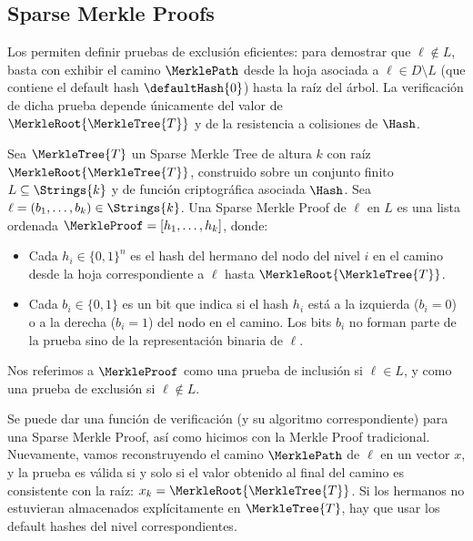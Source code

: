 \subsection{Sparse Merkle Proofs}

Los \SMT permiten definir pruebas de exclusión eficientes: para demostrar que $\ell \not\in L$, basta con exhibir el camino $\MerklePath$ desde la hoja asociada a $\ell \in D \setminus {L}$ (que contiene el default hash $\defaultHash{0}$) hasta la raíz del árbol. La verificación de dicha prueba depende únicamente del valor de $\MerkleRoot{\MerkleTree{T}}$ y de la resistencia a colisiones de $\Hash$. 

\begin{definition}
	Sea $\MerkleTree{T}$ un Sparse Merkle Tree de altura $k$ con raíz $\MerkleRoot{\MerkleTree{T}}$, construido sobre un conjunto finito $L \subseteq \Strings{k}$ y de función criptográfica asociada $\Hash$. Sea $\ell = (b_1, \ldots, b_k) \in \Strings{k}$. Una Sparse Merkle Proof de $\ell$ en $L$ es una lista ordenada $\MerkleProof = [h_1, \ldots, h_k]$, donde:
	\begin{itemize}
		\item Cada $h_i \in \{0,1\}^n$ es el hash del hermano del nodo del nivel $i$ en el camino desde la hoja correspondiente a $\ell$ hasta $\MerkleRoot{\MerkleTree{T}}$.
		\item Cada $b_i \in \{0,1\}$ es un bit que indica si el hash $h_i$ está a la izquierda ($b_i = 0$) o a la derecha ($b_i = 1$) del nodo en el camino. Los bits $b_i$ no forman parte de la prueba sino de la representación binaria de $\ell$.
	\end{itemize}
	Nos referimos a $\MerkleProof$ como una prueba de inclusión si $\ell \in L$, y como una prueba de exclusión si $\ell \not\in L$.
\end{definition}

Se puede dar una función de verificación (y su algoritmo correspondiente) para una Sparse Merkle Proof, así como hicimos con la Merkle Proof tradicional. Nuevamente, vamos reconstruyendo el camino $\MerklePath$ de $\ell$ en un vector $x$, y la prueba es válida si y solo si el valor obtenido al final del camino es consistente con la raíz: $x_k = \MerkleRoot{\MerkleTree{T}}$. Si los hermanos no estuvieran almacenados explícitamente en $\MerkleTree{T}$, hay que usar los default hashes del nivel correspondientes.

